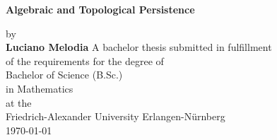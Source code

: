 \begin{titlepage}
    \begin{center}
        \vspace*{1cm}
        \Huge
        \textbf{Algebraic and Topological Persistence}
        \vspace{1cm}
        \LARGE
        
        by\\
        \textbf{Luciano Melodia}
        \vfill
        A bachelor thesis submitted in fulfillment\\
        of the requirements for the degree of\\
        Bachelor of Science (B.Sc.)\\
        in Mathematics\\ 
        \vspace{1.8cm}
        \Large
        at the\\
        Friedrich-Alexander University Erlangen-Nürnberg\\[0.5cm]
        \today
    \end{center}
\end{titlepage}